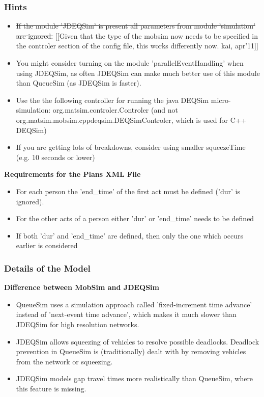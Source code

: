 \subsubsection{Hints}
\begin{itemize}
	\item \sout{If the module 'JDEQSim' is present all parameters from module 'simulation' are ignored.}  [[Given that the type of the mobsim now needs to be specified in the  controler section of the config file, this works differently now.  kai, apr'11]]
	\item You might consider turning on the module  'parallelEventHandling' when using JDEQSim, as often JDEQSim can make  much better use of this module than QueueSim (as JDEQSim is faster).
	\item Use  the the following controller for running the java DEQSim  micro-simulation: org.matsim.controler.Controler (and not  org.matsim.mobsim.cppdeqsim.DEQSimControler, which is used for C++  DEQSim)
\\
	\item If you are getting lots of breakdowns, consider using smaller squeezeTime (e.g. 10 seconds or lower)
\end{itemize}

\textbf{Requirements for the Plans XML File
\\}
\begin{itemize}
	\item For each person the 'end\_time' of the first act must be defined ('dur' is ignored).
	\item For the other acts of a person either 'dur' or 'end\_time' needs to be defined
	\item If both 'dur' and 'end\_time' are defined, then only the one which occurs earlier is considered
\end{itemize}

\subsubsection{Details of the Model}

\textbf{Difference between MobSim and JDEQSim}
\begin{itemize}
	\item QueueSim  uses a simulation approach called 'fixed-increment time advance'  instead of 'next-event time advance', which makes it much slower than  JDEQSim for high resolution networks.
	\item JDEQSim allows  squeezing of vehicles to resolve possible deadlocks. Deadlock prevention  in QueueSim is (traditionally) dealt with by removing vehicles from the  network or squeezing.
	\item JDEQSim models gap travel times more realistically than QueueSim, where this feature is missing.
\end{itemize}




